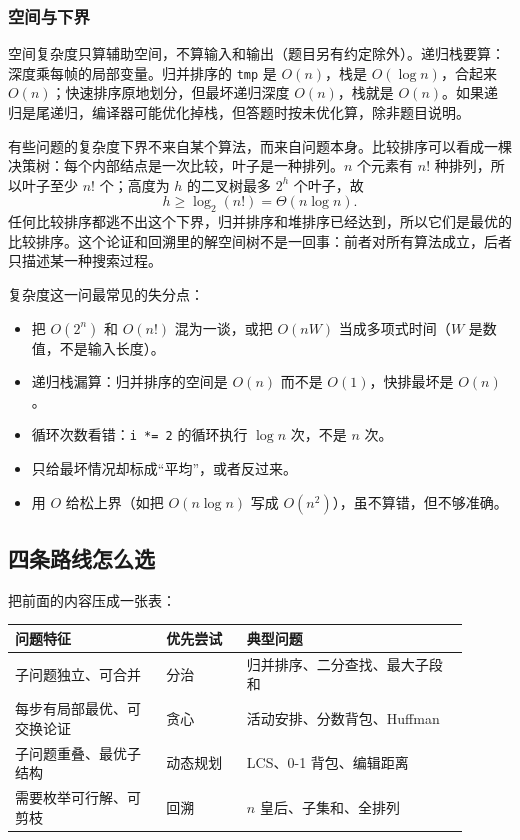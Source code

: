 \subsubsection{空间与下界}

空间复杂度只算辅助空间，不算输入和输出（题目另有约定除外）。递归栈要算：深度乘每帧的局部变量。归并排序的 \texttt{tmp} 是 $O(n)$，栈是 $O(\log n)$，合起来 $O(n)$；快速排序原地划分，但最坏递归深度 $O(n)$，栈就是 $O(n)$。如果递归是尾递归，编译器可能优化掉栈，但答题时按未优化算，除非题目说明。

有些问题的复杂度下界不来自某个算法，而来自问题本身。比较排序可以看成一棵决策树：每个内部结点是一次比较，叶子是一种排列。$n$ 个元素有 $n!$ 种排列，所以叶子至少 $n!$ 个；高度为 $h$ 的二叉树最多 $2^h$ 个叶子，故
\[
h\ge \log_2(n!)=\Theta(n\log n).
\]
任何比较排序都逃不出这个下界，归并排序和堆排序已经达到，所以它们是最优的比较排序。这个论证和回溯里的解空间树不是一回事：前者对所有算法成立，后者只描述某一种搜索过程。

\begin{attention}
复杂度这一问最常见的失分点：
\begin{itemize}
  \item 把 $O(2^n)$ 和 $O(n!)$ 混为一谈，或把 $O(nW)$ 当成多项式时间（$W$ 是数值，不是输入长度）。
  \item 递归栈漏算：归并排序的空间是 $O(n)$ 而不是 $O(1)$，快排最坏是 $O(n)$。
  \item 循环次数看错：\texttt{i *= 2} 的循环执行 $\log n$ 次，不是 $n$ 次。
  \item 只给最坏情况却标成“平均”，或者反过来。
  \item 用 $O$ 给松上界（如把 $O(n\log n)$ 写成 $O(n^2)$），虽不算错，但不够准确。
\end{itemize}
\end{attention}

\newpage
\subsection{四条路线怎么选}

把前面的内容压成一张表：

\begin{center}
\begin{tabular}{p{0.30\linewidth}p{0.16\linewidth}p{0.44\linewidth}}
\toprule
问题特征 & 优先尝试 & 典型问题 \\
\midrule
子问题独立、可合并 & 分治 & 归并排序、二分查找、最大子段和 \\
每步有局部最优、可交换论证 & 贪心 & 活动安排、分数背包、Huffman \\
子问题重叠、最优子结构 & 动态规划 & LCS、0-1 背包、编辑距离 \\
需要枚举可行解、可剪枝 & 回溯 & $n$ 皇后、子集和、全排列 \\
\bottomrule
\end{tabular}
\end{center}


